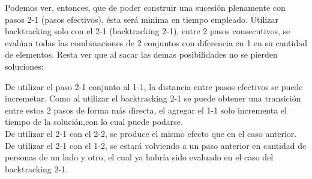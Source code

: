 Podemos ver, entonces, que de poder construir una sucesión plenamente con pasos 2-1 (pasos efectivos), ésta será minima en tiempo empleado. Utilizar backtracking solo con el 2-1 (backtracking 2-1), entre 2 pasos consecutivos, se evalúan todas las combinaciones de 2 conjuntos con diferencia en 1 en su cantidad de elementos. Resta ver que al sacar las demas posibilidades no se pierden soluciones:

De utilizar el paso 2-1 conjunto al 1-1, la distancia entre pasos efectivos se puede incremetar. Como al utilizar el backtracking 2-1 se puede obtener una transici\'on entre estos 2 pasos de forma más directa, el agregar el 1-1 solo incrementa el tiempo de la solución,con lo cual puede podarse.\\ 

De utilizar el 2-1 con el 2-2, se produce el mismo efecto que en el caso anterior.\\

De utilizar el 2-1 con el 1-2, se estar\'a volviendo a un paso anterior en cantidad de personas de un lado y otro, el cual ya habría sido evaluado en el caso del backtracking 2-1.

 

 
